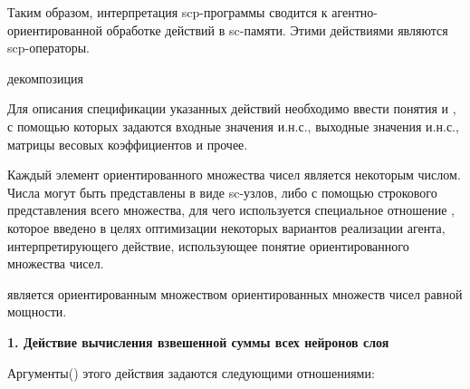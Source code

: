 Таким образом, интерпретация scp-программы сводится к агентно-ориентированной обработке действий в sc-памяти. Этими действиями являются scp-операторы.

\begin{SCn}
	\begin{scnrelfromset}{декомпозиция}
	\end{scnrelfromset}
\end{SCn}

Для описания спецификации указанных действий необходимо ввести понятия  и , с помощью которых задаются входные значения и.н.с., выходные значения и.н.с., матрицы весовых коэффициентов и прочее.

Каждый элемент ориентированного множества чисел является некоторым числом. Числа могут быть представлены в виде sc-узлов, либо с помощью строкового представления всего множества, для чего используется специальное отношение , которое введено в целях оптимизации некоторых вариантов реализации агента, интерпретирующего действие, использующее понятие ориентированного множества чисел.

\begin{SCn}
\end{SCn}

 является ориентированным множеством ориентированных множеств чисел равной мощности.


\textbf{1. Действие вычисления взвешенной суммы всех нейронов слоя}

Аргументы() этого действия задаются следующими отношениями:
\begin{SCn}
\end{SCn}

\begin{SCn}
\end{SCn}

